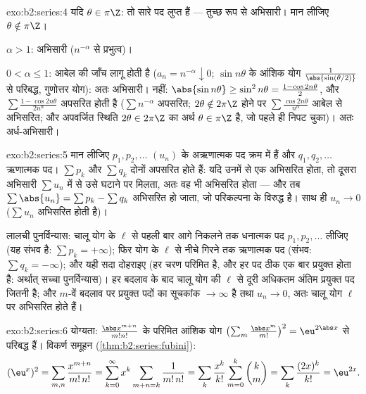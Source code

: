 \begin{solution}{exo:b2:series:4}
यदि $\theta \in \pi\Z$: तो सारे पद लुप्त हैं --- तुच्छ रूप से अभिसारी। मान लीजिए $\theta \notin \pi\Z$।

$\alpha > 1$:  अभिसारी ($n^{-\alpha}$ से प्रभुत्व)।

$0 < \alpha \leq 1$: आबेल की जाँच लागू होती है ($a_n = n^{-\alpha}
\downarrow 0$; $\sin n\theta$ के आंशिक योग $\frac{1}{\abs{\sin(\theta/2)}}$ से परिबद्ध,
गुणोत्तर योग): अतः अभिसारी।  नहीं: $\abs{\sin n\theta} \geq \sin^2 n\theta = \frac{1 -
\cos 2n\theta}{2}$, और $\sum \frac{1 - \cos 2n\theta}{2n^\alpha}$ अपसरित
होती है ($\sum n^{-\alpha}$ अपसरित; $2\theta
\notin 2\pi\Z$ होने पर $\sum
\frac{\cos 2n\theta}{n^\alpha}$ आबेल से अभिसरित; और अपवर्जित स्थिति
$2\theta \in 2\pi\Z$ का अर्थ $\theta \in \pi\Z$ है, जो पहले ही निपट चुका)। अतः अर्ध-अभिसारी।
\end{solution}

\begin{solution}{exo:b2:series:5}
मान लीजिए $p_1, p_2, \dots$ $(u_n)$ के अऋणात्मक पद क्रम में हैं और $q_1, q_2, \dots$ ऋणात्मक पद। $\sum p_k$
और $\sum
q_k$ दोनों अपसरित होते हैं: यदि उनमें से एक अभिसरित होता, तो दूसरा
अभिसारी $\sum u_n$ में से उसे घटाने पर मिलता, अतः वह भी अभिसरित होता --- और तब
$\sum \abs{u_n} = \sum p_k - \sum q_k$ अभिसरित हो जाता, जो परिकल्पना के विरुद्ध है। साथ ही $u_n \to 0$ ($\sum u_n$
अभिसरित होती है)।

लालची पुनर्विन्यास: चालू योग के $\ell$ से पहली बार आगे निकलने तक धनात्मक पद
$p_1, p_2, \dots$ लीजिए (यह संभव है: $\sum p_k =
+\infty$); फिर योग के $\ell$ से नीचे गिरने तक ऋणात्मक पद
(संभव: $\sum q_k = -\infty$); और यही सदा दोहराइए (हर चरण परिमित है, और हर पद ठीक एक बार
प्रयुक्त होता है: अर्थात् सच्चा पुनर्विन्यास)। हर बदलाव के बाद चालू योग
की $\ell$ से दूरी अधिकतम अंतिम प्रयुक्त पद जितनी है; और $m$-वें बदलाव पर
प्रयुक्त पदों का सूचकांक $\to \infty$ है तथा $u_n \to 0$, अतः चालू योग $\ell$ पर अभिसरित
होते हैं।
\end{solution}

\begin{solution}{exo:b2:series:6}
योग्यता: $\frac{\abs x^{m+n}}{m!n!}$ के परिमित आंशिक योग $\bigl(\sum_m
\frac{\abs x^m}{m!}\bigr)^2 = \eu^{2\abs x}$ से परिबद्ध हैं। विकर्ण समूहन
(\cref{thm:b2:series:fubini}):
\[
(\eu^{x})^2 = \sum_{m,n} \frac{x^{m+n}}{m!\,n!}
= \sum_{k=0}^{\infty} x^k \sum_{m+n=k} \frac{1}{m!\,n!}
= \sum_k \frac{x^k}{k!}\sum_{m=0}^{k}\binom km
= \sum_k \frac{(2x)^k}{k!} = \eu^{2x} .
\]
\end{solution}


